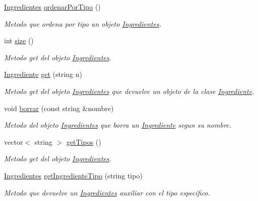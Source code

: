 \begin{DoxyCompactItemize}
\hyperlink{classIngredientes}{Ingredientes} \hyperlink{classIngredientes_a0ed6997b0c31498c42562d91a6df955d}{ordenar\+Por\+Tipo} ()
\begin{DoxyCompactList}\small\item\em Metodo que ordena por tipo un objeto \hyperlink{classIngredientes}{Ingredientes}. \end{DoxyCompactList}\item 
int \hyperlink{classIngredientes_aca2d4295b616fd0efeafce91009e0dda}{size} ()
\begin{DoxyCompactList}\small\item\em Metodo get del objeto \hyperlink{classIngredientes}{Ingredientes}. \end{DoxyCompactList}\item 
\hyperlink{classIngrediente}{Ingrediente} \hyperlink{classIngredientes_a1eddfac49913e486490721f6c114bf30}{get} (string n)
\begin{DoxyCompactList}\small\item\em Metodo get del objeto \hyperlink{classIngredientes}{Ingredientes} que devuelve un objeto de la clase \hyperlink{classIngrediente}{Ingrediente}. \end{DoxyCompactList}\item 
void \hyperlink{classIngredientes_af3fa6c08d9fea867c2f4dd3efad4223c}{borrar} (const string \&nombre)
\begin{DoxyCompactList}\small\item\em Metodo del objeto \hyperlink{classIngredientes}{Ingredientes} que borra un \hyperlink{classIngrediente}{Ingrediente} segun su nombre. \end{DoxyCompactList}\item 
vector$<$ string $>$ \hyperlink{classIngredientes_a9869f4642af46cd91d426c9a4e22019a}{get\+Tipos} ()
\begin{DoxyCompactList}\small\item\em Metodo get del objeto \hyperlink{classIngredientes}{Ingredientes}. \end{DoxyCompactList}\item 
\hyperlink{classIngredientes}{Ingredientes} \hyperlink{classIngredientes_a513a2a7af0995e893b288ca4cb4c49ef}{get\+Ingrediente\+Tipo} (string tipo)
\begin{DoxyCompactList}\small\item\em Metodo que devuelve un \hyperlink{classIngredientes}{Ingredientes} auxiliar con el tipo especifico. \end{DoxyCompactList}\end{DoxyCompactItemize}
